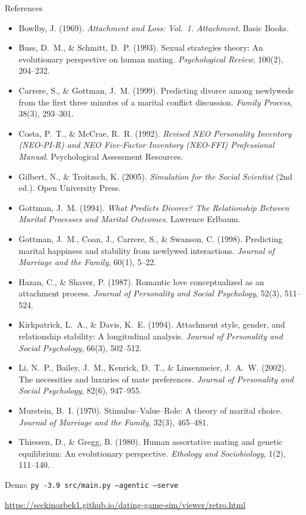\documentclass[aspectratio=169, 11pt]{beamer}
\begin{document}
\begin{frame}[allowframebreaks]{References}
\small
\begin{itemize}
    \item Bowlby, J. (1969). \textit{Attachment and Loss: Vol.\ 1. Attachment}. Basic Books.
    \item Buss, D.\ M., \& Schmitt, D.\ P. (1993). Sexual strategies theory: An evolutionary perspective on human mating. \textit{Psychological Review}, 100(2), 204--232.
    \item Carrere, S., \& Gottman, J.\ M. (1999). Predicting divorce among newlyweds from the first three minutes of a marital conflict discussion. \textit{Family Process}, 38(3), 293--301.
    \item Costa, P.\ T., \& McCrae, R.\ R. (1992). \textit{Revised NEO Personality Inventory (NEO-PI-R) and NEO Five-Factor Inventory (NEO-FFI) Professional Manual}. Psychological Assessment Resources.
    \item Gilbert, N., \& Troitzsch, K. (2005). \textit{Simulation for the Social Scientist} (2nd ed.). Open University Press.
    \item Gottman, J.\ M. (1994). \textit{What Predicts Divorce? The Relationship Between Marital Processes and Marital Outcomes}. Lawrence Erlbaum.
    \item Gottman, J.\ M., Coan, J., Carrere, S., \& Swanson, C. (1998). Predicting marital happiness and stability from newlywed interactions. \textit{Journal of Marriage and the Family}, 60(1), 5--22.
    \item Hazan, C., \& Shaver, P. (1987). Romantic love conceptualized as an attachment process. \textit{Journal of Personality and Social Psychology}, 52(3), 511--524.
    \item Kirkpatrick, L.\ A., \& Davis, K.\ E. (1994). Attachment style, gender, and relationship stability: A longitudinal analysis. \textit{Journal of Personality and Social Psychology}, 66(3), 502--512.
    \item Li, N.\ P., Bailey, J.\ M., Kenrick, D.\ T., \& Linsenmeier, J.\ A.\ W. (2002). The necessities and luxuries of mate preferences. \textit{Journal of Personality and Social Psychology}, 82(6), 947--955.
    \item Murstein, B.\ I. (1970). Stimulus--Value--Role: A theory of marital choice. \textit{Journal of Marriage and the Family}, 32(3), 465--481.
    \item Thiessen, D., \& Gregg, B. (1980). Human assortative mating and genetic equilibrium: An evolutionary perspective. \textit{Ethology and Sociobiology}, 1(2), 111--140.
\end{itemize}
\end{frame}

\begin{frame}[standout]
    \Large Demo: \texttt{py -3.9 src/main.py --agentic --serve}
    
    \vspace{1em}
    \normalsize
    \url{https://seckinozbek1.github.io/dating-game-sim/viewer/retro.html}
\end{frame}
\end{document}
